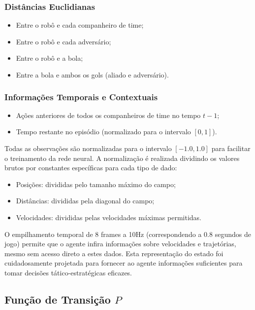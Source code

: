 \subsubsection{Distâncias Euclidianas}
\begin{itemize}
    \item Entre o robô e cada companheiro de time;
    \item Entre o robô e cada adversário;
    \item Entre o robô e a bola;
    \item Entre a bola e ambos os gols (aliado e adversário).
\end{itemize}

\subsubsection{Informações Temporais e Contextuais}
\begin{itemize}
    \item Ações anteriores de todos os companheiros de time no tempo $t-1$;
    \item Tempo restante no episódio (normalizado para o intervalo $[0,1]$).
\end{itemize}

Todas as observações são normalizadas para o intervalo $[-1.0, 1.0]$ para facilitar o treinamento da rede neural. A normalização é realizada dividindo os valores brutos por constantes específicas para cada tipo de dado:
\begin{itemize}
    \item Posições: divididas pelo tamanho máximo do campo;
    \item Distâncias: divididas pela diagonal do campo;
    \item Velocidades: divididas pelas velocidades máximas permitidas.
\end{itemize}

O empilhamento temporal de 8 frames a 10Hz (correspondendo a 0.8 segundos de jogo) permite que o agente infira informações sobre velocidades e trajetórias, mesmo sem acesso direto a estes dados. Esta representação do estado foi cuidadosamente projetada para fornecer ao agente informações suficientes para tomar decisões tático-estratégicas eficazes.

\subsection{Função de Transição $P$}

